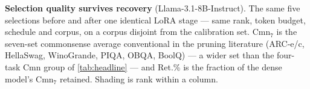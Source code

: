 \begin{table}[t]
\centering
\caption{\textbf{Selection quality survives recovery} (Llama-3.1-8B-Instruct). The same five
selections before and after one identical LoRA stage --- same rank, token budget, schedule and corpus,
on a corpus disjoint from the calibration set. $\text{Cmn}_7$ is the seven-set commonsense
average conventional in the pruning literature (ARC-e/c, HellaSwag, WinoGrande, PIQA, OBQA, BoolQ) ---
a wider set than the four-task Cmn group of \cref{tab:headline} --- and Ret.\% is the fraction of the
dense model's $\text{Cmn}_7$ retained. Shading is rank within a column.}
\label{tab:recovery}
{\footnotesize}
\end{table}
